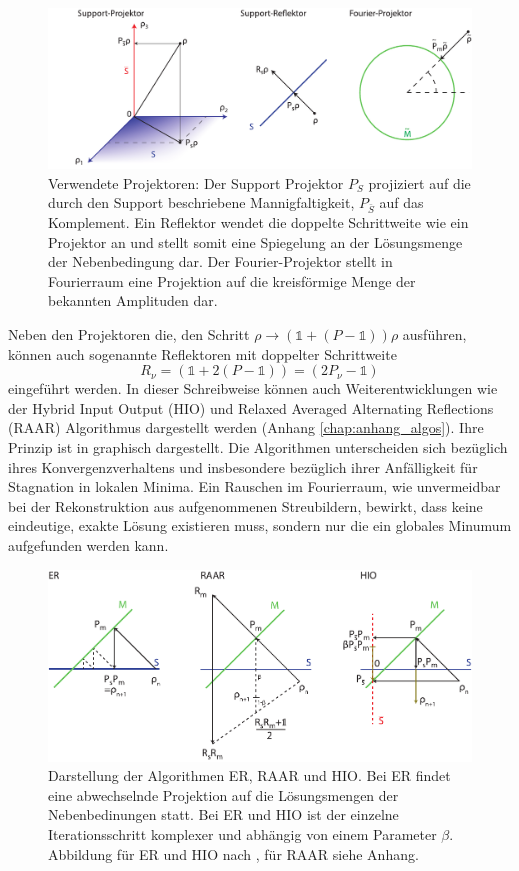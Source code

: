 \begin{figure}
	\centering
	\includegraphics[width=1\textwidth]{images/projektor.pdf}
	\caption[Projektoren]{Verwendete Projektoren: Der Support Projektor $P_S$ projiziert auf die durch den Support beschriebene Mannigfaltigkeit, $P_{\bar{S}}$ auf das Komplement. Ein Reflektor wendet die doppelte Schrittweite wie ein Projektor an und stellt somit eine Spiegelung an der Lösungsmenge der Nebenbedingung dar. Der Fourier-Projektor stellt in Fourierraum eine Projektion auf die kreisförmige Menge der bekannten Amplituden dar.}
	\label{fig:projektoren}
\end{figure}
Neben den Projektoren die, den Schritt $\rho\rightarrow (\mathbb{1}+(P-\mathbb{1}))\rho$ ausführen, können auch sogenannte Reflektoren mit doppelter Schrittweite
\begin{equation}
	R_\nu= (\mathbb{1}+2(P-\mathbb{1}))=(2P_\nu-\mathbb{1})
\end{equation}
eingeführt werden.
In dieser Schreibweise können auch Weiterentwicklungen wie der Hybrid Input Output (HIO) und Relaxed Averaged Alternating Reflections (RAAR) Algorithmus dargestellt werden (Anhang \ref{chap:anhang_algos}). Ihre Prinzip ist in  graphisch dargestellt. Die Algorithmen unterscheiden sich bezüglich ihres Konvergenzverhaltens und insbesondere bezüglich ihrer Anfälligkeit für Stagnation in lokalen Minima. 
Ein Rauschen im Fourierraum, wie unvermeidbar bei der Rekonstruktion aus aufgenommenen Streubildern, bewirkt, dass keine eindeutige, exakte Lösung existieren muss, sondern nur die ein globales Minumum aufgefunden werden kann. 
\begin{figure}
	\centering
	\includegraphics[width=1\textwidth]{images/algorithmen.pdf}
	\caption[Rekonstruktionsalgorithmen]{Darstellung der Algorithmen ER, RAAR und HIO. Bei ER findet eine abwechselnde Projektion auf die Lösungsmengen der Nebenbedinungen statt. Bei ER und HIO ist der einzelne Iterationsschritt komplexer und abhängig von einem Parameter $\beta$. Abbildung für ER und HIO nach \cite{marchesini2007}, für RAAR siehe Anhang.}
	\label{fig:recon}
\end{figure} 
